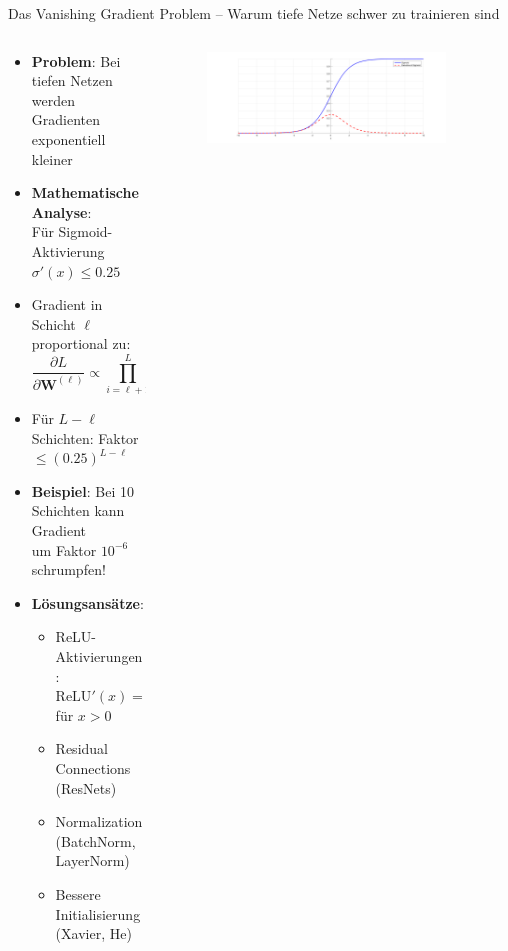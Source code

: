 \documentclass[aspectratio=1610, xcolor=dvipsnames, 9pt]{beamer}
\begin{document}
      \begin{frame}{Das Vanishing Gradient Problem -- Warum tiefe Netze schwer zu trainieren sind}
        \begin{columns}
          \begin{column}{0.6\textwidth}
            \begin{itemize}
              \item \textbf{Problem}: Bei tiefen Netzen werden Gradienten exponentiell kleiner
              \item \textbf{Mathematische Analyse}: \\
                    Für Sigmoid-Aktivierung $\sigma'(x) \leq 0.25$
              \item Gradient in Schicht $\ell$ proportional zu:
              \begin{equation}
                \frac{\partial L}{\partial \mathbf{W}^{(\ell)}} \propto \prod_{i=\ell+1}^{L} \mathbf{W}^{(i)} \sigma'(\mathbf{z}^{(i)})
              \end{equation}
              \item Für $L-\ell$ Schichten: Faktor $\leq (0.25)^{L-\ell}$ 
              \item \textbf{Beispiel}: Bei 10 Schichten kann Gradient \\
                    um Faktor $10^{-6}$ schrumpfen!
              \item \textbf{Lösungsansätze}:
              \begin{itemize}
                \item ReLU-Aktivierungen: $\text{ReLU}'(x) = 1$ für $x > 0$
                \item Residual Connections (ResNets)
                \item Normalization (BatchNorm, LayerNorm)
                \item Bessere Initialisierung (Xavier, He)
              \end{itemize}
            \end{itemize}
          \end{column}
           \begin{column}{0.4\textwidth}
             \begin{figure}
               \centering
                           \includegraphics[width=0.9\textwidth]{images/sigmoid.png}
               \end{figure}
           \end{column}
        \end{columns}
      \end{frame}
\end{document}
